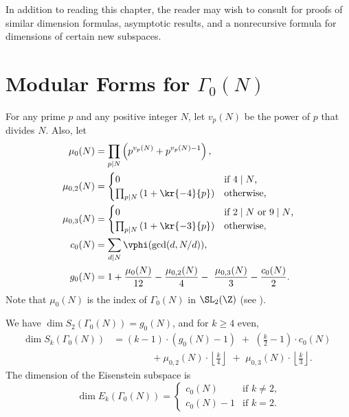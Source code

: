 In addition to reading this chapter, the reader may wish to consult
\cite{martin:dims} for proofs of similar dimension formulas,
asymptotic results, and a nonrecursive formula for dimensions of
certain new subspaces.

\section{Modular Forms for $\Gamma_0(N)$}\label{sec:dimg0}
For any prime $p$ and any positive integer $N$, let $v_p(N)$ be 
the power of $p$ that divides $N$. Also, let
\begin{align*}
\mu_0(N) &= \prod_{p\mid N} \left( p^{v_p(N)} + p^{v_p(N)-1} \right),\\
\mu_{0,2}(N) &= \begin{cases}
    0 & \text{if $4\mid N$,}\\
  \prod_{p\mid N} \left(1 + \kr{-4}{p}\right) & \text{otherwise,}
\end{cases}\\
\mu_{0,3}(N) &= \begin{cases}
    0 & \text{if $2\mid N$ or $9\mid N$,}\\
  \prod_{p\mid N} \left(1 + \kr{-3}{p}\right) & \text{otherwise,}
\end{cases}\\
c_0(N) &= \sum_{d\mid N} \vphi(\gcd(d,N/d)),\\
g_0(N) &= 1 + \frac{\mu_0(N)}{12} - \frac{\mu_{0,2}(N)}{4} - \
               \frac{\mu_{0,3}(N)}{3} - \frac{c_0(N)}{2}.\\
\end{align*}
Note that $\mu_0(N)$ is the index of $\Gamma_0(N)$ in $\SL_2(\Z)$
(see \exref{ch:dim}{ex:mu0n}).

\begin{proposition}\label{prop:dimg0}
We have $\dim S_2(\Gamma_0(N)) = g_0(N)$, and
for $k\geq 4$ even, 
\begin{align*}
\dim S_k(\Gamma_0(N)) &= 
 (k-1) \cdot (g_0(N) - 1) \,\,+ \,\,
\left( \frac{k}{2} - 1 \right) \cdot c_0(N) \,\,   \\
  &\qquad\qquad   + \mu_{0,2}(N)\cdot \left\lfloor\frac{k}{4}\right\rfloor \,\,+ \,\,
     \mu_{0,3}(N)\cdot \left\lfloor \frac{k}{3}\right\rfloor.
\end{align*}
The dimension of the Eisenstein subspace is
$$
  \dim E_k(\Gamma_0(N)) = 
\begin{cases}
c_0(N) & \text{if $k\neq 2$,}\\
c_0(N)-1 & \text{if $k=2$.}
\end{cases}
$$
\end{proposition}

